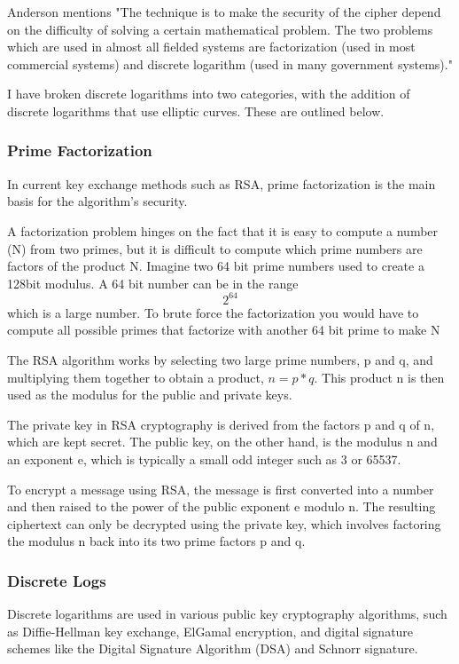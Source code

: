 \documentclass{article}
\begin{document}
Anderson mentions \cite{AndersonR2020} "The technique is to make the security of the cipher depend on the difficulty of solving a certain mathematical problem. The two problems which are used in almost all fielded systems are factorization (used in most commercial systems) and discrete logarithm (used in many government systems)." 

I have broken discrete logarithms into two categories, with the addition of discrete logarithms that use elliptic curves. These are outlined below.

\subsubsection{Prime Factorization}

In current key exchange methods such as RSA, prime factorization is the main basis for the algorithm's security. 

A factorization problem hinges on the fact that it is easy to compute a number (N) from two primes, but it is difficult to compute which prime numbers are factors of the product N. Imagine two 64 bit prime numbers used to create a 128bit modulus. A 64 bit number can be in the range \[2^{64}\] which is a large number. To brute force the factorization you would have to compute all possible primes that factorize with another 64 bit prime to make N

The RSA algorithm works by selecting two large prime numbers, p and q, and multiplying them together to obtain a product, $n = p*q$. This product n is then used as the modulus for the public and private keys.

The private key in RSA cryptography is derived from the factors p and q of n, which are kept secret. The public key, on the other hand, is the modulus n and an exponent e, which is typically a small odd integer such as 3 or 65537.

To encrypt a message using RSA, the message is first converted into a number and then raised to the power of the public exponent e modulo n. The resulting ciphertext can only be decrypted using the private key, which involves factoring the modulus n back into its two prime factors p and q.

\subsubsection{Discrete Logs}
Discrete logarithms are used in various public key cryptography algorithms, such as Diffie-Hellman key exchange, ElGamal encryption, and digital signature schemes like the Digital Signature Algorithm (DSA) and Schnorr signature.
\end{document}
